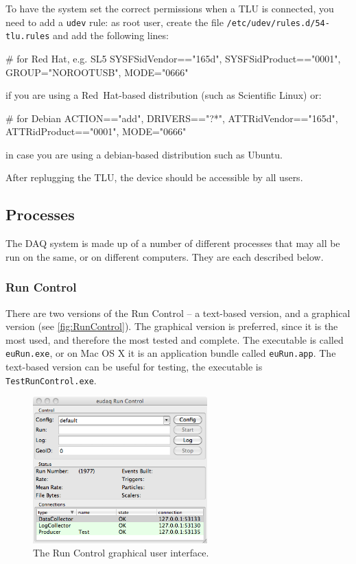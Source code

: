 To have the system set the correct permissions when a \gls{TLU} is
connected, you need to add a \texttt{udev} rule: as \textrm{root}
user, create the file \texttt{/etc/udev/rules.d/54-tlu.rules} and add
the following lines:

\begin{listing}
# for Red Hat, e.g. SL5
SYSFS{idVendor}=="165d", SYSFS{idProduct}=="0001", GROUP="NOROOTUSB", MODE="0666"
\end{listing}

if you are using a Red~Hat-based distribution (such as Scientific
Linux) or:

\begin{listing}
# for Debian
ACTION=="add", DRIVERS=="?*",  ATTR{idVendor}=="165d", ATTR{idProduct}=="0001",  MODE="0666"
\end{listing}

in case you are using a debian-based distribution such as Ubuntu.

After replugging the {TLU}, the device should be accessible by
all users.


\subsection{Processes}
The DAQ system is made up of a number of different processes that may all be run on the same,
or on different computers. They are each described below.

\subsubsection{Run Control}
There are two versions of the Run Control -- a text-based version, and a graphical version (see \autoref{fig:RunControl}).
The graphical version is preferred, since it is the most used, and therefore the most tested and complete.
The executable is called \texttt{euRun.exe}, or on Mac OS X it is an application bundle called \texttt{euRun.app}.
The text-based version can be useful for testing, the executable is \texttt{TestRunControl.exe}.

\begin{figure}[htb]
  \begin{center}
    \includegraphics[width=0.6\textwidth]{src/images/RunControl}
    \caption{The Run Control graphical user interface.}
    \label{fig:RunControl}
  \end{center}
\end{figure}

